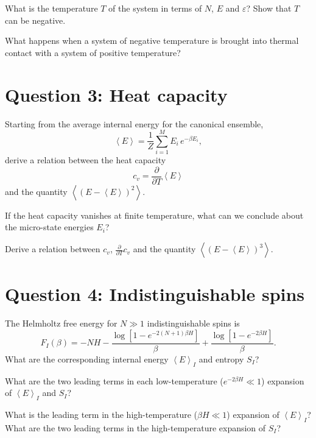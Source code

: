 \documentclass[12 pt]{article} %
\newcommand{\be}{\ensuremath{\beta} }
\newcommand{\eps}{\ensuremath{\varepsilon} }
\newcommand{\vev}[1]{\ensuremath{\left\langle #1 \right\rangle} }
\newcommand{\pderiv}[2]{\ensuremath{\frac{\partial #1}{\partial #2}} }
\newcommand{\showmarks}[1]{\rightline{\texttt{[#1 marks]}}} %
\begin{document}
\showmarks{4}

What is the temperature $T$ of the system in terms of $N$, $E$ and $\eps$?
Show that $T$ can be negative.

\showmarks{4}

What happens when a system of negative temperature is brought into thermal contact with a system of positive temperature?

\showmarks{4}



\newpage
\section*{Question 3: Heat capacity}
Starting from the average internal energy for the canonical ensemble,
\begin{equation*}
  \vev{E} = \frac{1}{Z} \sum_{i = 1}^M E_i \, e^{-\be E_i},
\end{equation*}
derive a relation between the heat capacity
\begin{equation*}
  c_v = \pderiv{}{T} \vev{E}
\end{equation*}
and the quantity $\vev{\left(E - \vev{E}\right)^2}$.

\showmarks{4}

If the heat capacity vanishes at finite temperature, what can we conclude about the micro-state energies $E_i$?

\showmarks{2}

Derive a relation between $c_v$, $\pderiv{}{T} c_v$ and the quantity $\vev{\left(E - \vev{E}\right)^3}$.

\showmarks{6}



\vfill
\section*{Question 4: Indistinguishable spins}
The Helmholtz free energy for $N \gg 1$ indistinguishable spins is
\begin{equation*}
  F_I(\be) = -NH - \frac{\log\left[1 - e^{-2(N + 1) \be H}\right]}{\be} + \frac{\log\left[1 - e^{-2 \be H}\right]}{\be}.
\end{equation*}
What are the corresponding internal energy $\vev{E}_I$ and entropy $S_I$?

\showmarks{4}

What are the two leading terms in each low-temperature ($e^{-2\be H} \ll 1$) expansion of $\vev{E}_I$ and $S_I$?

\showmarks{6}

What is the leading term in the high-temperature ($\be H \ll 1$) expansion of $\vev{E}_I$?
What are the two leading terms in the high-temperature expansion of $S_I$?

\showmarks{6}



\end{document}
